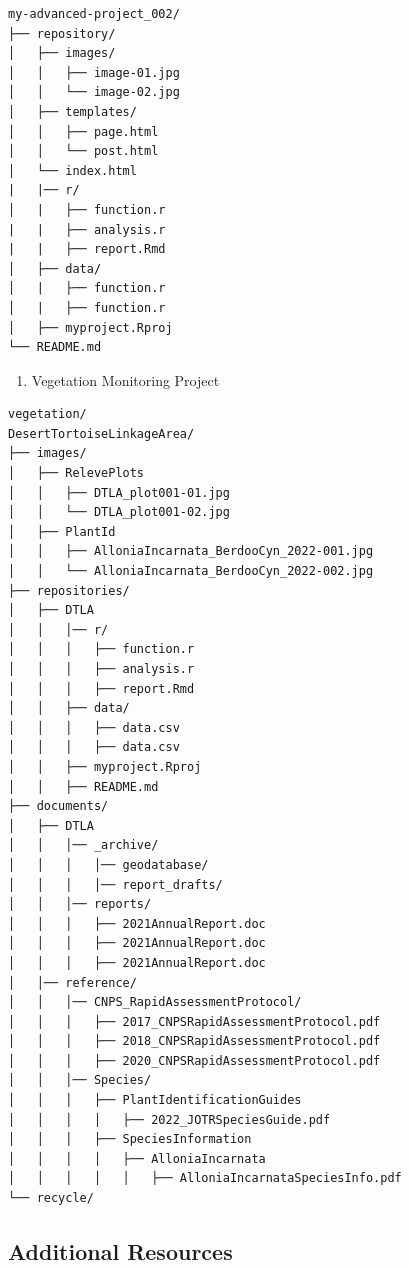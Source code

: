 \documentclass[
]{book}
\providecommand{\tightlist}{%
  \setlength{\itemsep}{0pt}\setlength{\parskip}{0pt}}
\begin{document}
\begin{verbatim}
my-advanced-project_002/
├── repository/
│   ├── images/
│   │   ├── image-01.jpg
│   │   └── image-02.jpg
│   ├── templates/
│   │   ├── page.html
│   │   └── post.html
│   └── index.html
|   |── r/
│   |   ├── function.r
|   |   ├── analysis.r
|   |   ├── report.Rmd
│   ├── data/
│   |   ├── function.r
│   |   ├── function.r
│   ├── myproject.Rproj
└── README.md
\end{verbatim}

\begin{enumerate}
\def\labelenumi{\arabic{enumi})}
\setcounter{enumi}{1}
\tightlist
\item
  Vegetation Monitoring Project
\end{enumerate}

\begin{verbatim}
vegetation/
DesertTortoiseLinkageArea/
├── images/
│   ├── RelevePlots
│   │   ├── DTLA_plot001-01.jpg
│   │   └── DTLA_plot001-02.jpg
│   ├── PlantId
│   │   ├── AlloniaIncarnata_BerdooCyn_2022-001.jpg
│   │   └── AlloniaIncarnata_BerdooCyn_2022-002.jpg
├── repositories/
│   ├── DTLA
│   │   │── r/
│   │   │   ├── function.r
│   │   │   ├── analysis.r
│   │   │   ├── report.Rmd
│   │   ├── data/
│   │   │   ├── data.csv
│   │   │   ├── data.csv
│   │   ├── myproject.Rproj
│   │   ├── README.md
├── documents/
│   ├── DTLA
│   │   │── _archive/
│   │   │   │── geodatabase/
│   │   │   │── report_drafts/
│   │   │── reports/
│   │   │   ├── 2021AnnualReport.doc
│   │   │   ├── 2021AnnualReport.doc
│   │   │   ├── 2021AnnualReport.doc
│   │── reference/
│   │   │── CNPS_RapidAssessmentProtocol/
│   │   │   ├── 2017_CNPSRapidAssessmentProtocol.pdf
│   │   │   ├── 2018_CNPSRapidAssessmentProtocol.pdf
│   │   │   ├── 2020_CNPSRapidAssessmentProtocol.pdf
│   │   │── Species/
│   │   │   ├── PlantIdentificationGuides
│   │   │   │   ├── 2022_JOTRSpeciesGuide.pdf
│   │   │   ├── SpeciesInformation
│   │   │   │   ├── AlloniaIncarnata
│   │   │   │   │   ├── AlloniaIncarnataSpeciesInfo.pdf
└── recycle/
\end{verbatim}

\hypertarget{additional-resources}{%
\subsection{Additional Resources}\label{additional-resources}}
\end{document}

